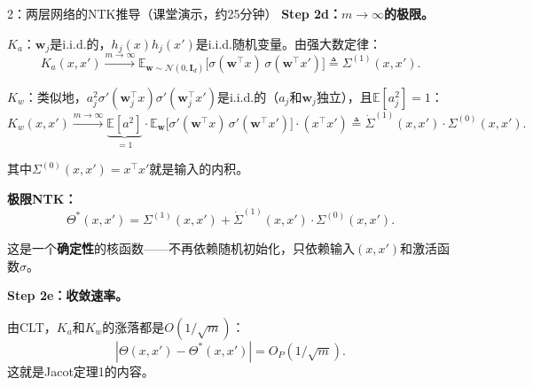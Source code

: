 \documentclass[11pt,a4paper]{article}
\newcommand{\E}{\mathbb{E}}
\newcommand{\cN}{\mathcal{N}}
\newcommand{\bI}{\mathbf{I}}
\newcommand{\bw}{\mathbf{w}}
\begin{document}
\begin{handcalc}{2：两层网络的NTK推导（课堂演示，约25分钟）}
\bigskip
\textbf{Step 2d：$m\to\infty$的极限。}

$K_a$：$\bw_j$是i.i.d.的，$h_j(x)h_j(x')$是i.i.d.随机变量。由强大数定律：
\[
K_a(x,x') \xrightarrow{m\to\infty} \E_{\bw\sim\cN(0,\bI_d)}\big[\sigma(\bw^\top x)\,\sigma(\bw^\top x')\big] \triangleq \Sigma^{(1)}(x,x').
\]

$K_w$：类似地，$a_j^2\sigma'(\bw_j^\top x)\sigma'(\bw_j^\top x')$是i.i.d.的（$a_j$和$\bw_j$独立），且$\E[a_j^2]=1$：
\[
K_w(x,x') \xrightarrow{m\to\infty} \underbrace{\E[a^2]}_{=1}\cdot\E_{\bw}\big[\sigma'(\bw^\top x)\,\sigma'(\bw^\top x')\big]\cdot(x^\top x') \triangleq \dot\Sigma^{(1)}(x,x')\cdot\Sigma^{(0)}(x,x').
\]

其中$\Sigma^{(0)}(x,x')=x^\top x'$就是输入的内积。

\textbf{极限NTK：}
\begin{equation}
\boxed{\Theta^*(x,x') = \Sigma^{(1)}(x,x') + \dot\Sigma^{(1)}(x,x')\cdot\Sigma^{(0)}(x,x').}
\end{equation}

这是一个\textbf{确定性}的核函数——不再依赖随机初始化，只依赖输入$(x,x')$和激活函数$\sigma$。

\bigskip
\textbf{Step 2e：收敛速率。}

由CLT，$K_a$和$K_w$的涨落都是$O(1/\sqrt{m})$：
\[
|\Theta(x,x') - \Theta^*(x,x')| = O_P(1/\sqrt{m}).
\]
这就是Jacot定理1的内容。
\end{handcalc}
\end{document}

